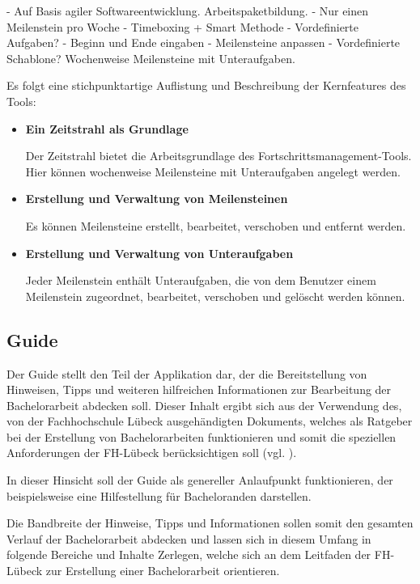 \documentclass{scrreprt}
\begin{document}
- Auf Basis agiler Softwareentwicklung. Arbeitspaketbildung.
- Nur einen Meilenstein pro Woche
- Timeboxing + Smart Methode
- Vordefinierte Aufgaben?
- Beginn und Ende eingaben
- Meilensteine anpassen
- Vordefinierte Schablone? Wochenweise Meilensteine mit Unteraufgaben.

Es folgt eine stichpunktartige Auflistung und Beschreibung der Kernfeatures des Tools:
\begin{itemize}
\item \textbf{Ein Zeitstrahl als Grundlage}
\par Der Zeitstrahl bietet die Arbeitsgrundlage des Fortschrittsmanagement-Tools. Hier können wochenweise Meilensteine mit Unteraufgaben angelegt werden.
\item \textbf{Erstellung und Verwaltung von Meilensteinen}
\par Es können Meilensteine erstellt, bearbeitet, verschoben und entfernt werden.
\item \textbf{Erstellung und Verwaltung von Unteraufgaben}
\par Jeder Meilenstein enthält Unteraufgaben, die von dem Benutzer einem Meilenstein zugeordnet, bearbeitet, verschoben und gelöscht werden können.
\end{itemize}

\subsection{Guide}
\par Der Guide stellt den Teil der Applikation dar, der die Bereitstellung von Hinweisen, Tipps und weiteren hilfreichen Informationen zur Bearbeitung der Bachelorarbeit abdecken soll. Dieser Inhalt ergibt sich aus der Verwendung des, von der Fachhochschule Lübeck ausgehändigten Dokuments, welches als Ratgeber bei der Erstellung von Bachelorarbeiten funktionieren und somit die speziellen Anforderungen der FH-Lübeck berücksichtigen soll (vgl. \cite[Kapitel 1]{FHLuebeckBAAnleitung}).
\par In dieser Hinsicht soll der Guide als genereller Anlaufpunkt funktionieren, der beispielsweise eine Hilfestellung für Bacheloranden darstellen.\\

\par Die Bandbreite der Hinweise, Tipps und Informationen sollen somit den gesamten Verlauf der Bachelorarbeit abdecken und lassen sich in diesem Umfang in folgende Bereiche und Inhalte Zerlegen, welche sich an dem Leitfaden der FH-Lübeck\cite{FHLuebeckBAAnleitung} zur Erstellung einer Bachelorarbeit orientieren.\\
\end{document}
